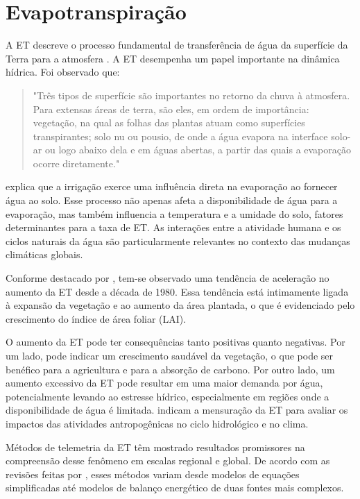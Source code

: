\section{Evapotranspiração}

A ET descreve o processo fundamental de transferência de água da superfície da Terra para a atmosfera \parencite{carmody_fao2023}. A ET desempenha um papel importante na dinâmica hídrica. Foi observado que:

\begin{quote}
  "Três tipos de superfície são importantes no retorno da chuva à atmosfera. Para extensas áreas de terra, são eles, em ordem de importância: vegetação, na qual as folhas das plantas atuam como superfícies transpirantes; solo nu ou pousio, de onde a água evapora na interface solo-ar ou logo abaixo dela e em águas abertas, a partir das quais a evaporação ocorre diretamente." \parencite[{p. 121}]{Penman_evapotranspiration1948}
\end{quote}

\textcite{Penman_evapotranspiration1948} explica que a irrigação exerce uma influência direta na evaporação ao fornecer água ao solo. Esse processo não apenas afeta a disponibilidade de água para a evaporação, mas também influencia a temperatura e a umidade do solo, fatores determinantes para a taxa de ET. As interações entre a atividade humana e os ciclos naturais da água são particularmente relevantes no contexto das mudanças climáticas globais. 

Conforme destacado por \textcite{yang_nature2023}, tem-se observado uma tendência de aceleração no aumento da ET desde a década de 1980. Essa tendência está intimamente ligada à expansão da vegetação e ao aumento da área plantada, o que é evidenciado pelo crescimento do índice de área foliar (LAI).

O aumento da ET pode ter consequências tanto positivas quanto negativas. Por um lado, pode indicar um crescimento saudável da vegetação, o que pode ser benéfico para a agricultura e para a absorção de carbono. Por outro lado, um aumento excessivo da ET pode resultar em uma maior demanda por água, potencialmente levando ao estresse hídrico, especialmente em regiões onde a disponibilidade de água é limitada. \textcite{yang_nature2023} indicam a mensuração da ET para avaliar os impactos das atividades antropogênicas no ciclo hidrológico e no clima.

Métodos de telemetria da ET têm mostrado resultados promissores na compreensão desse fenômeno em escalas regional e global. De acordo com as revisões feitas por \textcite{Zhao_evapotranspiration_med2009, Zhang_evapotranspiration_med2016}, esses métodos variam desde modelos de equações simplificadas até modelos de balanço energético de duas fontes mais complexos. 

